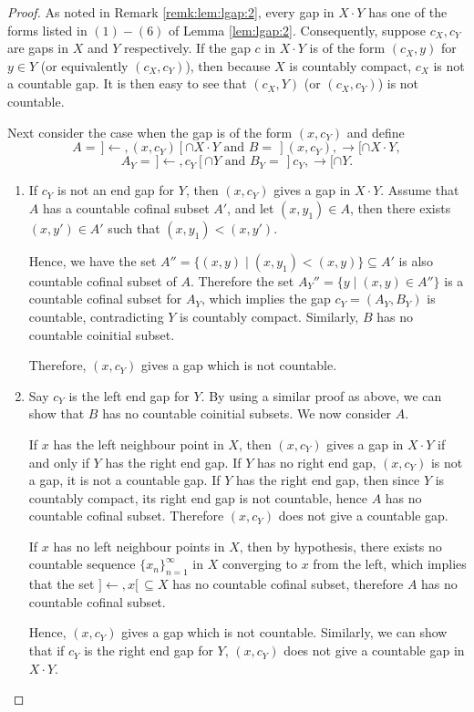 \documentclass[12pt,oneside,english]{amsbook}
\numberwithin{equation}{section} %
\numberwithin{figure}{section} %
\theoremstyle{plain}
\numberwithin{section}{chapter}
\theoremstyle{plain}
\begin{document}
\begin{proof}
  As noted in Remark \ref{remk:lem:lgap:2}, every gap in $X \cdot Y$ has one of the forms listed in $(1) - (6)$ of Lemma \ref{lem:lgap:2}. Consequently, suppose $c_{X},c_{Y}$ are gaps in $X$ and $Y$ respectively. If the gap $c$ in $X \cdot Y$ is of the form $(c_X, y)$ for $y \in Y$ (or equivalently $(c_X,c_Y)$), then because $X$ is countably compact, $c_X$ is not a countable gap. It is then easy to see that $(c_X,Y)$ (or $(c_X,c_Y)$) is not countable.
  
  Next consider the case when the gap is of the form $(x, c_{Y})$ and define $$A  = \, ] \leftarrow,  (x, c_{Y}) [ \cap X \cdot Y \text{ and }B  = \, ](x,c_{Y}), \rightarrow [ \cap X \cdot Y,$$
  $$A_{Y}  = \,  ] \leftarrow,  c_{Y} [ \cap Y \text{ and } B_{Y}  = \, ] c_{Y}, \rightarrow [ \cap Y.$$
  \begin{enumerate}
  \item If $c_{Y}$ is not an end gap for $Y$, then $(x, c_{Y})$ gives a gap in $X \cdot Y$. Assume that $A$ has a countable cofinal subset $A'$, and let $(x,y_{1})  \in  A$, then there exists $(x,y')  \in  A'$ such that $(x,y_{1}) < (x,y')$.

    Hence, we have the set $A''  =  \{ (x,y) \; | \; (x,y_{1}) < (x,y) \} \subseteq A'$ is also countable cofinal subset of $A$. Therefore the set $A_{Y}''  =  \{ y \; | \; (x,y)  \in A'' \}$ is a countable cofinal subset for $A_Y$, which implies the gap $c_{Y}  =  (A_{Y},B_{Y})$ is countable, contradicting $Y$ is countably compact. Similarly, $B$ has no countable coinitial subset.

    Therefore, $(x, c_{Y})$ gives a gap which is not countable.
  \item  Say $c_{Y}$ is the left end gap for $Y$. By using a similar proof as above, we can show that $B$ has no countable coinitial subsets. We now consider $A$.

    If $x$ has the left neighbour point in $X$, then  $(x, c_{Y})$ gives a gap in $X \cdot Y$ if and only if $Y$ has the right end gap.
    If $Y$ has no right end gap,  $(x, c_{Y})$ is not a gap, it is not a countable gap.
    If $Y$ has the right end gap, then since $Y$ is countably compact, its right end gap is not countable, hence $A$ has no countable cofinal subset. Therefore $(x, c_{Y})$ does not give a countable gap.

    If $x$ has no left neighbour points in $X$, then by hypothesis, there exists no countable sequence $\{x_{n}\}_{n =1}^{\infty}$ in $X$ converging to $x$ from the left, which implies that the set $] \leftarrow, x [ \, \subseteq X$ has no countable cofinal subset, therefore $A$ has no countable cofinal subset.

    Hence, $(x, c_{Y})$ gives a gap which is not countable.
    Similarly, we can show that if $c_{Y}$ is the right end gap for $Y$, $(x, c_{Y})$ does not give a countable gap in $X \cdot Y$.
  \end{enumerate}
 
 
\end{proof}
\end{document}
